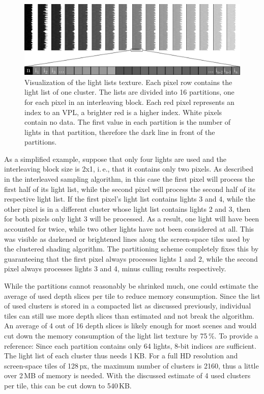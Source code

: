 \begin{figure}[h]
    \includegraphics[width=\textwidth]{graphics/light_lists}
    \caption{Visualization of the light lists texture. Each pixel row contains the light list of one cluster. The lists are divided into 16 partitions, one for each pixel in an interleaving block. Each red pixel represents an index to an VPL, a brighter red is a higher index. White pixels contain no data. The first value in each partition is the number of lights in that partition, therefore the dark line in front of the partitions.}
    \label{fig:impl:light_lists}
\end{figure}

As a simplified example, suppose that only four lights are used and the interleaving block size is 2x1, i.\,e., that it contains only two pixels. As described in the interleaved sampling algorithm, in this case the first pixel will process the first half of its light list, while the second pixel will process the second half of its respective light list. If the first pixel's light list contains lights 3 and 4, while the other pixel is in a different cluster whose light list contains lights 2 and 3, then for both pixels only light 3 will be processed. As a result, one light will have been accounted for twice, while two other lights have not been considered at all. This was visible as darkened or brightened lines along the screen-space tiles used by the clustered shading algorithm. The partitioning scheme completely fixes this by guaranteeing that the first pixel always processes lights 1 and 2, while the second pixel always processes lights 3 and 4, minus culling results respectively.

While the partitions cannot reasonably be shrinked much, one could estimate the average of used depth slices per tile to reduce memory consumption. Since the list of used clusters is stored in a compacted list as discussed previously, individual tiles can still use more depth slices than estimated and not break the algorithm. An average of 4 out of 16 depth slices is likely enough for most scenes and would cut down the memory consumption of the light list texture by 75\,\%. To provide a reference: Since each partition contains only 64 lights, 8-bit indices are sufficient. The light list of each cluster thus needs 1\,KB. For a full HD resolution and screen-space tiles of 128\,px, the maximum number of clusters is 2160, thus a little over 2\,MB of memory is needed. With the discussed estimate of 4 used clusters per tile, this can be cut down to 540\,KB.

